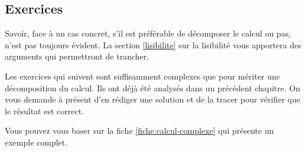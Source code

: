 		\subsection{Exercices}
		
			Savoir, face à un cas concret, s'il est préférable 
			de décomposer le calcul ou pas, n'est pas toujours évident.	
			La section \vref{lisibilite}
			sur la lisibilité vous apportera des arguments
			qui permettront de trancher.
	
			Les exercices qui suivent sont suffisamment complexes
			que pour mériter une décomposition du calcul.
			Ils ont déjà été analysés dans un précédent chapitre.
			On vous demande à présent d'en rédiger une solution
			et de la tracer pour vérifier que le résultat est correct.
	
			Vous pouvez vous baser sur la fiche \vref{fiche:calcul-complexe}
			qui présente un exemple complet.
			
